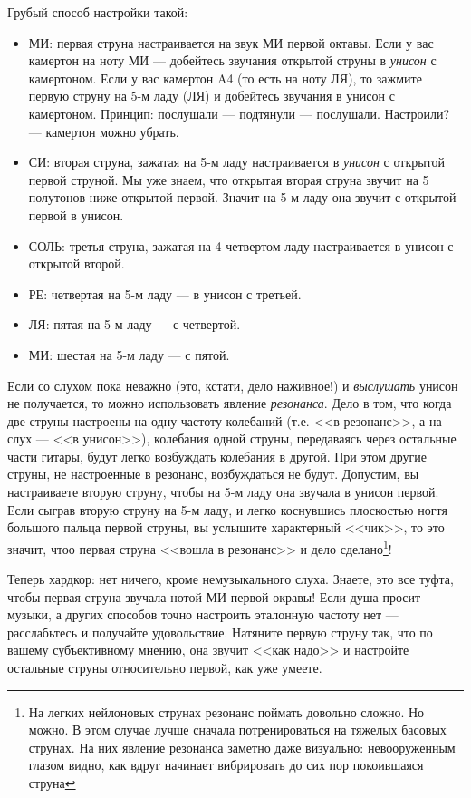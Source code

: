 Грубый способ настройки такой:
\begin{itemize}
    \item МИ: первая струна настраивается на звук МИ первой октавы. Если у вас камертон на ноту МИ --- добейтесь звучания открытой струны в \emph{унисон} с камертоном. Если у вас камертон A4 (то есть на ноту ЛЯ), то зажмите первую струну на 5-м ладу (ЛЯ) и добейтесь звучания в унисон с камертоном. Принцип: послушали --- подтянули --- послушали. Настроили? --- камертон можно убрать.
    \item СИ: вторая струна, зажатая на 5-м ладу настраивается в \emph{унисон} с открытой первой струной. Мы уже знаем, что открытая вторая струна звучит на 5 полутонов ниже открытой первой. Значит на 5-м ладу она звучит с открытой первой в унисон.
    \item СОЛЬ: третья струна, зажатая на 4 четвертом ладу настраивается в унисон с открытой второй.
    \item РЕ: четвертая на 5-м ладу --- в унисон с третьей.
    \item ЛЯ: пятая на 5-м ладу --- с четвертой.
    \item МИ: шестая на 5-м ладу --- с пятой.
\end{itemize}

Если со слухом пока неважно (это, кстати, дело наживное!) и \emph{выслушать} унисон не получается, то можно использовать явление \emph{резонанса}. Дело в том, что когда две струны настроены на одну частоту колебаний (т.е. <<в резонанс>>, а на слух --- <<в унисон>>), колебания одной струны, передаваясь через остальные части гитары, будут легко возбуждать колебания в другой. При этом другие струны, не настроенные в резонанс, возбуждаться не будут. Допустим, вы настраиваете вторую струну, чтобы на 5-м ладу она звучала в унисон первой. Если сыграв вторую струну на 5-м ладу, и легко коснувшись плоскостью ногтя большого пальца первой струны, вы услышите характерный <<чик>>, то это значит, чтоо первая струна <<вошла в резонанс>> и дело сделано\footnote{На легких нейлоновых струнах резонанс поймать довольно сложно. Но можно. В этом случае лучше сначала потренироваться на тяжелых басовых струнах. На них явление резонанса заметно даже визуально: невооруженным глазом видно, как вдруг начинает вибрировать до сих пор покоившаяся струна}!

Теперь хардкор: нет ничего, кроме немузыкального слуха. Знаете, это все туфта, чтобы первая струна звучала нотой МИ первой окравы! Если душа просит музыки, а других способов точно настроить эталонную частоту нет --- расслабьтесь и получайте удовольствие. Натяните первую струну так, что по вашему субъективному мнению, она звучит <<как надо>> и настройте остальные струны относительно первой, как уже умеете.


